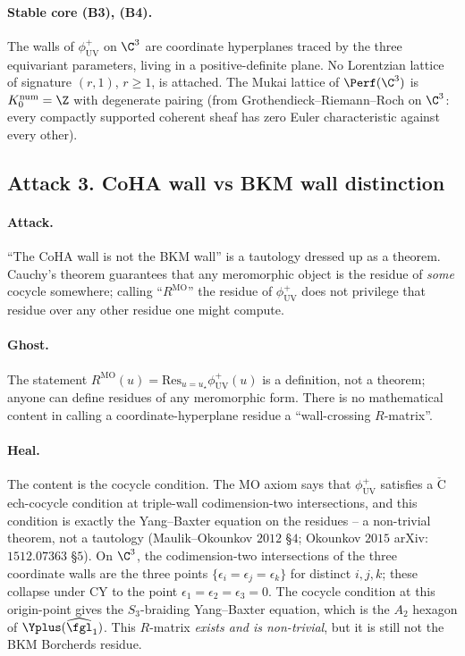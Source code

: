\paragraph{Stable core (B3), (B4).} The walls of $\phi^+_{\mathrm{UV}}$
on $\C^3$ are coordinate hyperplanes traced by the three equivariant
parameters, living in a positive-definite plane. No Lorentzian
lattice of signature $(r, 1)$, $r \geq 1$, is attached. The Mukai
lattice of $\Perf(\C^3)$ is $K_0^{\mathrm{num}} = \Z$ with degenerate
pairing (from Grothendieck--Riemann--Roch on $\C^3$: every compactly
supported coherent sheaf has zero Euler characteristic against every
other).

\subsection*{Attack 3.  CoHA wall vs BKM wall distinction}

\paragraph{Attack.} ``The CoHA wall is not the BKM wall'' is a
tautology dressed up as a theorem. Cauchy's theorem guarantees that
any meromorphic object is the residue of \emph{some} cocycle
somewhere; calling ``$R^{\mathrm{MO}}$'' the residue of
$\phi^+_{\mathrm{UV}}$ does not privilege that residue over any other
residue one might compute.

\paragraph{Ghost.} The statement
$R^{\mathrm{MO}}(u) = \mathrm{Res}_{u = u_\star}
\phi^+_{\mathrm{UV}}(u)$ is a definition, not a theorem; anyone can
define residues of any meromorphic form. There is no mathematical
content in calling a coordinate-hyperplane residue a ``wall-crossing
$R$-matrix''.

\paragraph{Heal.} The content is the cocycle condition. The MO
axiom says that $\phi^+_{\mathrm{UV}}$ satisfies a $\mathrm{\check C}
$ech-cocycle condition at triple-wall codimension-two intersections,
and this condition is exactly the Yang--Baxter equation on the
residues -- a non-trivial theorem, not a tautology (Maulik--Okounkov
$2012$ \S $4$; Okounkov $2015$ arXiv:$1512.07363$ \S $5$). On $\C^3$,
the codimension-two intersections of the three coordinate walls are
the three points $\{\epsilon_i = \epsilon_j = \epsilon_k\}$ for
distinct $i, j, k$; these collapse under CY to the point $\epsilon_1
= \epsilon_2 = \epsilon_3 = 0$. The cocycle condition at this
origin-point gives the $S_3$-braiding Yang--Baxter equation, which
is the $A_2$ hexagon of $\Yplus(\widehat{\fgl}_1)$. This $R$-matrix
\emph{exists and is non-trivial}, but it is still not the BKM
Borcherds residue.

